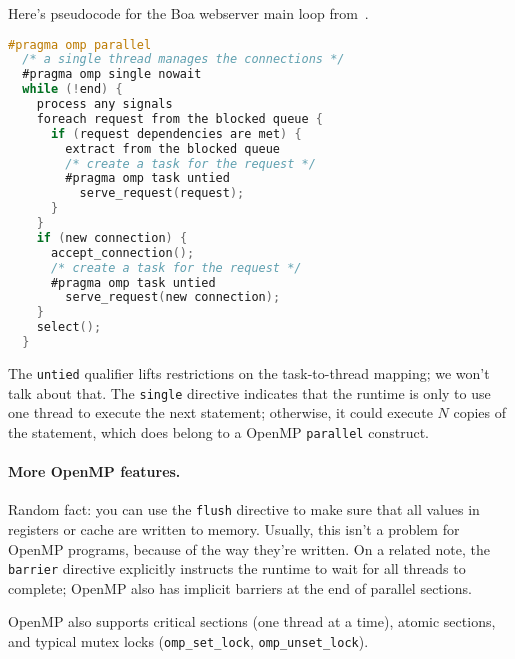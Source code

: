 \documentclass[11pt]{article}
\begin{document}
Here's pseudocode for the Boa webserver main loop from~\cite{Ayguade:2009:DOT:1512157.1512430}.
{\small
\begin{lstlisting}[language=C,morekeywords={foreach,pragma,omp,parallel,single,nowait,task,untied}]
#pragma omp parallel
  /* a single thread manages the connections */
  #pragma omp single nowait
  while (!end) {
    process any signals
    foreach request from the blocked queue {
      if (request dependencies are met) {
        extract from the blocked queue
        /* create a task for the request */
        #pragma omp task untied
          serve_request(request);
      }
    }
    if (new connection) {
      accept_connection();
      /* create a task for the request */
      #pragma omp task untied
        serve_request(new connection);
    }
    select();
  }
\end{lstlisting}
}
The {\tt untied} qualifier lifts restrictions on the task-to-thread mapping;
we won't talk about that. The {\tt single} directive indicates that the
runtime is only to use one thread to execute the next statement; otherwise,
it could execute $N$ copies of the statement, which does belong to a
OpenMP {\tt parallel} construct.

\paragraph{More OpenMP features.} 
Random fact: you can use the {\tt flush} directive to make sure that
all values in registers or cache are written to memory. Usually, this
isn't a problem for OpenMP programs, because of the way they're
written. On a related note, the {\tt barrier} directive explicitly
instructs the runtime to wait for all threads to complete; OpenMP also
has implicit barriers at the end of parallel sections.  

OpenMP also supports critical sections (one thread at a time), atomic
sections, and typical mutex locks (\verb+omp_set_lock+,
\verb+omp_unset_lock+).



\end{document}
